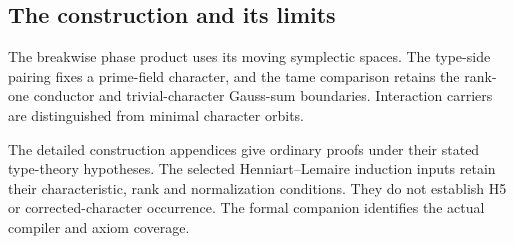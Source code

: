 \subsection*{The construction and its limits}
The breakwise phase product uses its moving symplectic spaces. The type-side
pairing fixes a prime-field character, and the tame comparison retains the
rank-one conductor and trivial-character Gauss-sum boundaries. Interaction
carriers are distinguished from minimal character orbits.

The detailed construction appendices give ordinary proofs under their stated
type-theory hypotheses. The selected Henniart--Lemaire induction inputs
\cite{HenniartLemaire2011} retain their characteristic, rank and normalization
conditions. They do not establish H5 or corrected-character occurrence.
The formal companion identifies the actual compiler and axiom coverage.

\endgroup
